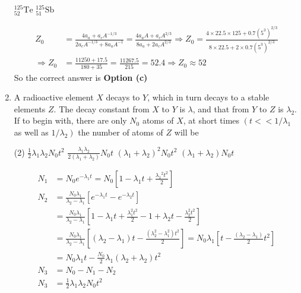 \begin{enumerate}
\begin{tasks}
		\task[\textbf{c.}]${ }_{52}^{125} \mathrm{Te}$
		\task[\textbf{d.}] ${ }_{51}^{125} \mathrm{Sb}$
	\end{tasks}
\begin{answer}
	$$
	\begin{aligned}
	Z_0&=\frac{4 a_a+a_c A^{-1 / 3}}{2 a_c A^{-1 / 3}+8 a_a A^{-1}}=\frac{4 a_a A+a_c A^{2 / 3}}{8 a_a+2 a_c A^{2 / 3}} \Rightarrow Z_0=\frac{4 \times 22.5 \times 125+0.7\left(5^3\right)^{2 / 3}}{8 \times 22.5+2 \times 0.7\left(5^3\right)^{2 / 3}}\\
	\Rightarrow Z_0&=\frac{11250+17.5}{180+35}=\frac{11267.5}{215}=52.4 \Rightarrow Z_0 \approx 52
\end{aligned}
$$
	So the correct answer is \textbf{Option (c)}
\end{answer}
	\item A radioactive element $X$ decays to $Y$, which in turn decays to a stable elements $Z$. The decay constant from $X$ to $Y$ is $\lambda$, and that from $Y$ to $Z$ is $\lambda_2$. If to begin with, there are only $N_0$ atoms of $X$, at short times $\left(t<<1 / \lambda_1\right.$ as well as $\left.1 / \lambda_2\right)$ the number of atoms of $Z$ will be
 \begin{tasks}(2)
	\task[\textbf{a.}]$\frac{1}{2} \lambda_1 \lambda_2 N_0 t^2$
	\task[\textbf{b.}] $\frac{\lambda_1 \lambda_2}{2\left(\lambda_1+\lambda_2\right)} N_0 t$
	\task[\textbf{c.}]$\left(\lambda_1+\lambda_2\right)^2 N_0 t^2$
	\task[\textbf{d.}] $\left(\lambda_1+\lambda_2\right) N_0 t$
\end{tasks}
\begin{answer}
	$$
	\begin{aligned}
	N_1&=N_0 e^{-\lambda_1 t}=N_0\left[1-\lambda_1 t+\frac{\lambda_1{ }^2 t^2}{2}\right]\\
	N_2&=\frac{N_0 \lambda_1}{\lambda_2-\lambda_1}\left[e^{-\lambda_1 t}-e^{-\lambda_2 t}\right] \\
	&=\frac{N_0 \lambda_1}{\lambda_2-\lambda_1}\left[1-\lambda_1 t+\frac{\lambda_1^2 t^2}{2}-1+\lambda_2 t-\frac{\lambda_2^2 t^2}{2}\right] \\
	&=\frac{N_0 \lambda_1}{\lambda_2-\lambda_1}\left[\left(\lambda_2-\lambda_1\right) t-\frac{\left(\lambda_2^2-\lambda_1^2\right) t^2}{2}\right]=N_0 \lambda_1\left[t-\frac{\left(\lambda_2-\lambda_1\right)}{2} t^2\right] \\
	&=N_0 \lambda_1 t-\frac{N_0}{2} \lambda_1\left(\lambda_2+\lambda_2\right) t^2\\
	N_3&=N_0-N_1-N_2 \\
	N_3&=\frac{1}{2} \lambda_1 \lambda_2 N_0 t^2

\end{aligned}$$
\end{answer}
\end{enumerate}
